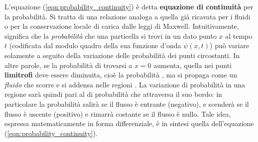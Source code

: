 \documentclass[../../FisicaTeorica.tex]{subfiles}
\begin{document}
L'equazione (\ref{eqn:probability_continuity}) è detta \textbf{equazione di continuità} per la probabilità. Si tratta di una relazione analoga a quella già ricavata per i fluidi o per la conservazione locale di carica dalle leggi di Maxwell. Intuitivamente, significa che la \textit{probabilità} che una particella si trovi in un dato punto $x$ al tempo $t$ (codificata dal modulo quadro della sua funzione d'onda $\psi(x,t)$) può variare solamente a seguito della variazione delle probabilità dei punti circostanti. In altre parole, se la probabilità di trovarsi a $x=0$ aumenta, quella nei punti \textbf{limitrofi} deve essere diminuita, cioè la probabilità , ma si propaga come un \textit{fluido} che scorre e si addensa nelle regioni . La variazione di probabilità in una regione sarà quindi pari al  di probabilità che attraversa il suo bordo: in particolare la probabilità salirà se il flusso è entrante (negativo), e scenderà se il flusso è uscente (positivo) e rimarrà costante se il flusso è nullo. Tale idea, espressa matematicamente in forma differenziale, è in sintesi quella dell'equazione (\ref{eqn:probability_continuity}).\\
\end{document}
